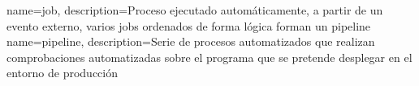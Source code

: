{
    name=job,
    description={Proceso ejecutado automáticamente, a partir de un evento externo, varios jobs ordenados de forma lógica forman un pipeline}
}
{
        name=pipeline,
        description={Serie de procesos automatizados que realizan comprobaciones automatizadas sobre el programa que se pretende desplegar en el entorno de producción}
}

